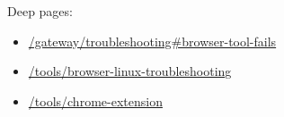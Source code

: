 Deep pages:

\begin{itemize}
  \item \href{/gateway/troubleshooting\#browser-tool-fails}{/gateway/troubleshooting\#browser-tool-fails}
  \item \href{/tools/browser-linux-troubleshooting}{/tools/browser-linux-troubleshooting}
  \item \href{/tools/chrome-extension}{/tools/chrome-extension}
\end{itemize}




\clearpage
